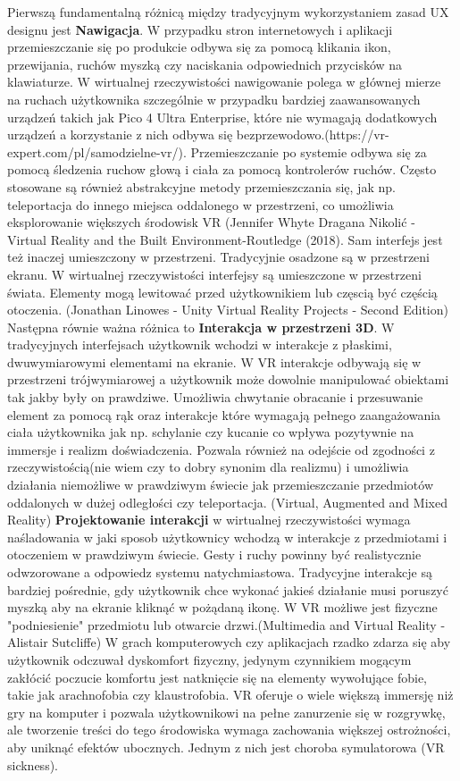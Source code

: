 Pierwszą fundamentalną różnicą między tradycyjnym wykorzystaniem zasad UX designu jest \textbf{Nawigacja}. W przypadku stron internetowych i aplikacji przemieszczanie się po produkcie odbywa się za pomocą klikania ikon, przewijania, ruchów myszką czy naciskania odpowiednich przycisków na klawiaturze. W wirtualnej rzeczywistości nawigowanie polega w głównej mierze na ruchach użytkownika szczególnie w przypadku bardziej zaawansowanych urządzeń takich jak  Pico 4 Ultra Enterprise, które nie wymagają dodatkowych urządzeń a korzystanie z nich odbywa się bezprzewodowo.(https://vr-expert.com/pl/samodzielne-vr/). Przemieszczanie po systemie odbywa się za pomocą śledzenia ruchow głową i ciała za pomocą kontrolerów ruchów. Często stosowane są również abstrakcyjne metody przemieszczania się, jak np. teleportacja do innego miejsca oddalonego w przestrzeni, co umożliwia eksplorowanie większych środowisk VR (Jennifer Whyte Dragana Nikolić - Virtual Reality and the Built Environment-Routledge (2018). Sam interfejs jest też inaczej umieszczony w przestrzeni. Tradycyjnie osadzone są w przestrzeni ekranu. W wirtualnej rzeczywistości interfejsy są umieszczone w przestrzeni  świata. Elementy mogą lewitować przed użytkownikiem lub częscią być częścią otoczenia. (Jonathan Linowes - Unity Virtual Reality Projects - Second Edition)
Następna równie ważna różnica to \textbf{Interakcja w przestrzeni 3D}. W tradycyjnych interfejsach  użytkownik wchodzi w interakcje z płaskimi, dwuwymiarowymi elementami na ekranie. W VR interakcje odbywają się w przestrzeni trójwymiarowej a użytkownik może dowolnie manipulować  obiektami tak jakby były on prawdziwe. Umożliwia chwytanie obracanie i przesuwanie element za pomocą rąk oraz interakcje które wymagają pełnego zaangażowania ciała użytkownika jak np. schylanie czy kucanie co wpływa pozytywnie na immersje i realizm doświadczenia.
Pozwala również na odejście od zgodności z rzeczywistością(nie wiem czy  to dobry synonim dla realizmu) i umożliwia działania niemożliwe w prawdziwym świecie jak przemieszczanie przedmiotów oddalonych w dużej odległości czy teleportacja. (Virtual, Augmented and Mixed Reality)
\textbf{Projektowanie interakcji} w wirtualnej rzeczywistości wymaga naśladowania w jaki sposob użytkownicy wchodzą w interakcje z przedmiotami i otoczeniem w prawdziwym świecie. Gesty i ruchy powinny być realistycznie odwzorowane a odpowiedz systemu natychmiastowa. Tradycyjne interakcje są bardziej pośrednie, gdy użytkownik chce wykonać jakieś działanie musi poruszyć myszką aby na ekranie kliknąć w pożądaną ikonę. W VR możliwe jest fizyczne "podniesienie" przedmiotu lub otwarcie drzwi.(Multimedia and Virtual Reality - Alistair Sutcliffe)    
W grach komputerowych czy aplikacjach rzadko zdarza się aby użytkownik odczuwał dyskomfort fizyczny, jedynym czynnikiem mogącym zakłócić poczucie komfortu jest natknięcie się na elementy wywołujące fobie, takie jak arachnofobia czy klaustrofobia. VR oferuje o wiele większą immersję niż gry na komputer i pozwala użytkownikowi na pełne zanurzenie się w rozgrywkę, ale tworzenie treści do tego środowiska wymaga zachowania większej ostrożności, aby uniknąć efektów ubocznych. Jednym z nich jest choroba symulatorowa (VR sickness).

